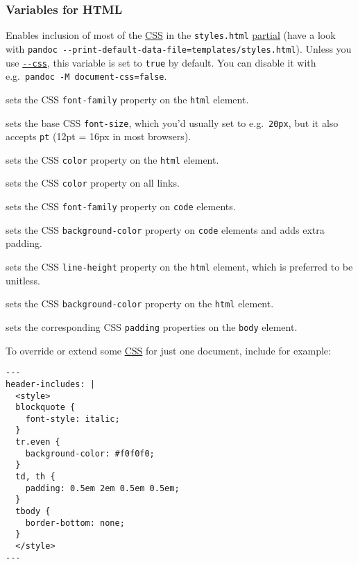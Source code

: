 \documentclass[
]{article}
\providecommand{\tightlist}{%
  \setlength{\itemsep}{0pt}\setlength{\parskip}{0pt}}
\begin{document}
\subsubsection{Variables for HTML}\label{variables-for-html}

\begin{description}
\tightlist
\item[\texttt{document-css}]
Enables inclusion of most of the
\href{https://developer.mozilla.org/en-US/docs/Learn/CSS}{CSS} in the
\texttt{styles.html} \hyperref[partials]{partial} (have a look with
\texttt{pandoc\ -\/-print-default-data-file=templates/styles.html}).
Unless you use \hyperref[option--css]{\texttt{-\/-css}}, this variable
is set to \texttt{true} by default. You can disable it with
e.g.~\texttt{pandoc\ -M\ document-css=false}.
\item[\texttt{mainfont}]
sets the CSS \texttt{font-family} property on the \texttt{html} element.
\item[\texttt{fontsize}]
sets the base CSS \texttt{font-size}, which you'd usually set to
e.g.~\texttt{20px}, but it also accepts \texttt{pt} (12pt = 16px in most
browsers).
\item[\texttt{fontcolor}]
sets the CSS \texttt{color} property on the \texttt{html} element.
\item[\texttt{linkcolor}]
sets the CSS \texttt{color} property on all links.
\item[\texttt{monofont}]
sets the CSS \texttt{font-family} property on \texttt{code} elements.
\item[\texttt{monobackgroundcolor}]
sets the CSS \texttt{background-color} property on \texttt{code}
elements and adds extra padding.
\item[\texttt{linestretch}]
sets the CSS \texttt{line-height} property on the \texttt{html} element,
which is preferred to be unitless.
\item[\texttt{backgroundcolor}]
sets the CSS \texttt{background-color} property on the \texttt{html}
element.
\item[\texttt{margin-left}, \texttt{margin-right}, \texttt{margin-top},
\texttt{margin-bottom}]
sets the corresponding CSS \texttt{padding} properties on the
\texttt{body} element.
\end{description}

To override or extend some
\href{https://developer.mozilla.org/en-US/docs/Learn/CSS}{CSS} for just
one document, include for example:

\begin{verbatim}
---
header-includes: |
  <style>
  blockquote {
    font-style: italic;
  }
  tr.even {
    background-color: #f0f0f0;
  }
  td, th {
    padding: 0.5em 2em 0.5em 0.5em;
  }
  tbody {
    border-bottom: none;
  }
  </style>
---
\end{verbatim}
\end{document}
